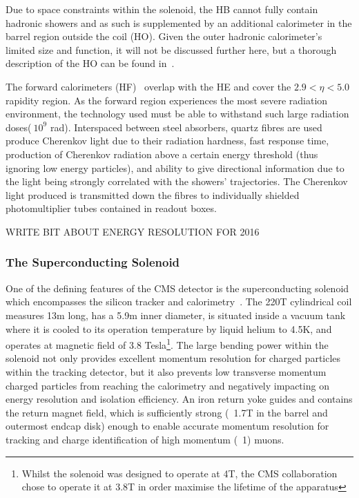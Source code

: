 Due to space constraints within the solenoid, the HB cannot fully contain hadronic showers and as such is supplemented by an additional calorimeter in the barrel region outside the coil (HO). Given the outer hadronic calorimeter's limited size and function, it will not be discussed further here, but a thorough description of the HO can be found in~\cite{HO}.

The forward calorimeters (HF)~\cite{HF} overlap with the HE and cover the $2.9 < \eta < 5.0$ rapidity region.
As the forward region experiences the most severe radiation environment, the technology used must be able to withstand such large radiation doses($~10^{9}$ rad). 
Interspaced between steel absorbers, quartz fibres are used produce Cherenkov light due to their radiation hardness, fast response time, production of Cherenkov radiation above a certain energy threshold (thus ignoring low energy particles), and ability to give directional information due to the light being strongly correlated with the showers' trajectories.
The Cherenkov light produced is transmitted down the fibres to individually shielded photomultiplier tubes contained in readout boxes.

WRITE BIT ABOUT ENERGY RESOLUTION FOR 2016

\subsubsection{The Superconducting Solenoid}\label{subsubsec:magnet}
One of the defining features of the CMS detector is the superconducting solenoid which encompasses the silicon tracker and calorimetry~\cite{Acquistapace:1997fm,Herve:2000}.
The 220T cylindrical coil measures 13m long, has a 5.9m inner diameter, is situated inside a vacuum tank where it is cooled to its operation temperature by liquid helium to 4.5K, and operates at magnetic field of 3.8 Tesla\footnote{Whilst the solenoid was designed to operate at 4T, the CMS collaboration chose to operate it at 3.8T in order maximise the lifetime of the apparatus}.
The large bending power within the solenoid not only provides excellent momentum resolution for charged particles within the tracking detector, but it also prevents low transverse momentum charged particles from reaching the calorimetry and negatively impacting on energy resolution and isolation efficiency.
An iron return yoke guides and contains the return magnet field, which is sufficiently strong (~1.7T in the barrel and outermost endcap disk) enough to enable accurate momentum resolution for tracking and charge identification of high momentum (~1\TeVc) muons.

